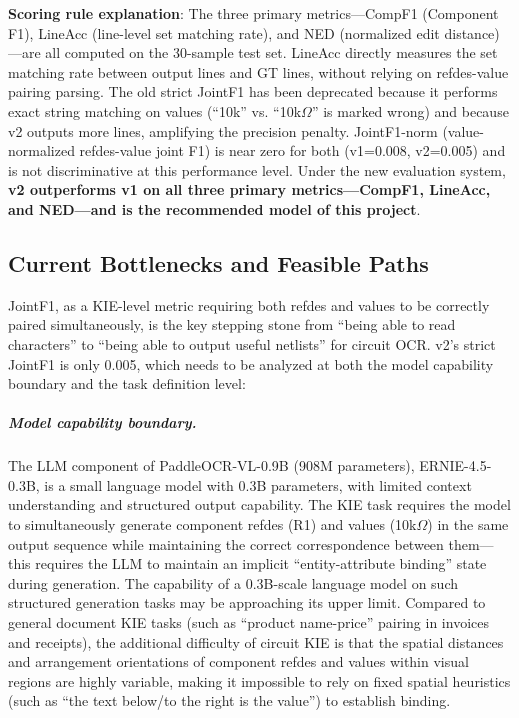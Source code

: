 \textbf{Scoring rule explanation}: The three primary metrics---CompF1 (Component F1), LineAcc (line-level set matching rate), and NED (normalized edit distance)---are all computed on the 30-sample test set. LineAcc directly measures the set matching rate between output lines and GT lines, without relying on refdes-value pairing parsing. The old strict JointF1 has been deprecated because it performs exact string matching on values (``10k'' vs. ``10k$\Omega$'' is marked wrong) and because v2 outputs more lines, amplifying the precision penalty. JointF1-norm (value-normalized refdes-value joint F1) is near zero for both (v1=0.008, v2=0.005) and is not discriminative at this performance level. Under the new evaluation system, \textbf{v2 outperforms v1 on all three primary metrics---CompF1, LineAcc, and NED---and is the recommended model of this project}.

\subsection{Current Bottlenecks and Feasible Paths}

JointF1, as a KIE-level metric requiring both refdes and values to be correctly paired simultaneously, is the key stepping stone from ``being able to read characters'' to ``being able to output useful netlists'' for circuit OCR. v2's strict JointF1 is only 0.005, which needs to be analyzed at both the model capability boundary and the task definition level:

\subparagraph{Model capability boundary.}
The LLM component of PaddleOCR-VL-0.9B (908M parameters), ERNIE-4.5-0.3B, is a small language model with 0.3B parameters, with limited context understanding and structured output capability. The KIE task requires the model to simultaneously generate component refdes (R1) and values (10k$\Omega$) in the same output sequence while maintaining the correct correspondence between them---this requires the LLM to maintain an implicit ``entity-attribute binding'' state during generation. The capability of a 0.3B-scale language model on such structured generation tasks may be approaching its upper limit. Compared to general document KIE tasks (such as ``product name-price'' pairing in invoices and receipts), the additional difficulty of circuit KIE is that the spatial distances and arrangement orientations of component refdes and values within visual regions are highly variable, making it impossible to rely on fixed spatial heuristics (such as ``the text below/to the right is the value'') to establish binding.

